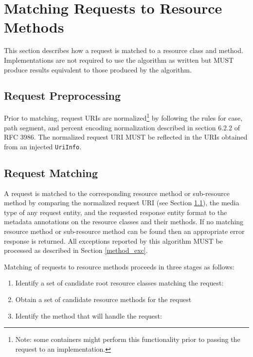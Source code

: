 \section{Matching Requests to Resource Methods}
\label{mapping_requests_to_java_methods}

This section describes how a request is matched to a resource class and method. Implementations are not required to use the algorithm as written but MUST produce results equivalent to those produced by the algorithm.

\subsection{Request Preprocessing}
\label{reqpreproc}

Prior to matching, request URIs are normalized\footnote{Note: some containers might perform this functionality prior to
passing the request to an implementation.} by following the rules for case, path segment, and percent encoding
normalization described in section 6.2.2 of RFC 3986. The normalized request URI MUST be reflected in the URIs obtained
from an injected \lstinline{UriInfo}.

\subsection{Request Matching}
\label{request_matching}

A request is matched to the corresponding resource method or sub-resource method by comparing the
\textcolor{highlight green}{normalized} request URI (see Section \ref{reqpreproc}), the media type of any request
entity, and the requested response entity format to the metadata annotations on the resource classes and their methods.
If no matching resource method or sub-resource method can be found then an appropriate error response is returned. All
exceptions reported by this algorithm MUST be processed as described in Section \ref{method_exc}.

Matching of requests to resource methods proceeds in three stages as follows:

\begin{enumerate}
    \item Identify a set of candidate root resource classes matching the request:
    \item \label{find_object} Obtain a set of candidate resource methods for the request
    \item \label{find_method} Identify the method that will handle the request:
\end{enumerate}
